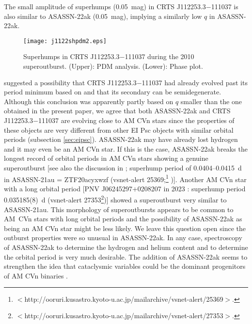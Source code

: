 \documentclass{article}
\def\cite{\citealt}
\begin{document}
   The small amplitude of superhumps (0.05~mag) in
CRTS J112253.3$-$111037 is also similar to ASASSN-22ak (0.05~mag),
implying a similarly low $q$ in ASASSN-22ak.

\begin{figure*}
\begin{center}
\texttt{[image: j1122shpdm2.eps]}
\caption{
   Superhumps in CRTS J112253.3$-$111037 during the 2010 superoutburst.
   (Upper): PDM analysis.
   (Lower): Phase plot.
}
\label{fig:j1122shpdm2}
\end{center}
\end{figure*}

   \citet{bre12j1122} suggested a possibility that
CRTS J112253.3$-$111037 had already evolved past its period
minimum based on \citet{pod03amcvn} and that its secondary
can be semidegenerate.  Although this conclusion was apparently
partly based on $q$ smaller than the one obtained in the present paper,
we agree that both ASASSN-22ak and CRTS J112253.3$-$111037
are evolving close to AM CVn stars since the properties of
these objects are very different from other EI Psc objects
with similar orbital periods (subsection \ref{sec:eipsc}).
ASASSN-22ak may have already lost hydrogen and it may even be
an AM CVn star.  If this is the case, ASASSN-22ak breaks
the longest record of orbital periods in AM CVn stars showing
a genuine superoutburst [see also the discussion in
\citet{kat23nsv1440}; superhump period of 0.0404--0.0415~d
in ASASSN-21au = ZTF20acyxwzf
(vsnet-alert 25369;\footnote{
   $<$http://ooruri.kusastro.kyoto-u.ac.jp/mailarchive/vsnet-alert/25369$>$.
} \cite{iso21asassn21auatel14390,riv22asassn21au})].
Another AM CVn star with a long orbital period
[PNV J06245297$+$0208207 in 2023 \citep{mae23j0624atel15849}:
superhump period 0.035185(8)~d
(vsnet-alert 27353\footnote{
   $<$http://ooruri.kusastro.kyoto-u.ac.jp/mailarchive/vsnet-alert/27353$>$.
})]
showed a superoutburst very similar to ASASSN-21au.
This morphology of superoutbursts appears to be common
to AM~CVn stars with long orbital periods and the possibility
of ASASSN-22ak as being an AM CVn star might be less likely.
We leave this question open since the outburst properties
were so unusual in ASASSN-22ak.
In any case, spectroscopy of ASASSN-22ak to determine
the hydrogen and helium content and to determine
the orbital period is very much desirable.
The addition of ASASSN-22ak seems to strengthen the idea
that cataclysmic variables could be the dominant
progenitors of AM CVn binaries
\citep[see, e.g.,][]{sak23amcvnevol,bel23amcvnevol}.
\end{document}
